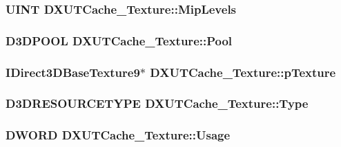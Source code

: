 \label{struct_d_x_u_t_cache___texture_a6c3eaa5b8daece02e1d6dd7d25c5b07b}
\hypertarget{struct_d_x_u_t_cache___texture_a74815def3a731c1f8f91671d2911da56}{
\subsubsection[{MipLevels}]{\setlength{\rightskip}{0pt plus 5cm}UINT {\bf DXUTCache\_\-Texture::MipLevels}}}
\label{struct_d_x_u_t_cache___texture_a74815def3a731c1f8f91671d2911da56}
\hypertarget{struct_d_x_u_t_cache___texture_ae08c2f8171241e38e1e0137ccf6315a2}{
\subsubsection[{Pool}]{\setlength{\rightskip}{0pt plus 5cm}D3DPOOL {\bf DXUTCache\_\-Texture::Pool}}}
\label{struct_d_x_u_t_cache___texture_ae08c2f8171241e38e1e0137ccf6315a2}
\hypertarget{struct_d_x_u_t_cache___texture_ac776b61763c8a6d71e5b250f5aa2d4a4}{
\subsubsection[{pTexture}]{\setlength{\rightskip}{0pt plus 5cm}IDirect3DBaseTexture9$\ast$ {\bf DXUTCache\_\-Texture::pTexture}}}
\label{struct_d_x_u_t_cache___texture_ac776b61763c8a6d71e5b250f5aa2d4a4}
\hypertarget{struct_d_x_u_t_cache___texture_a7ae45cc28d48e8d8d8051511fe404262}{
\subsubsection[{Type}]{\setlength{\rightskip}{0pt plus 5cm}D3DRESOURCETYPE {\bf DXUTCache\_\-Texture::Type}}}
\label{struct_d_x_u_t_cache___texture_a7ae45cc28d48e8d8d8051511fe404262}
\hypertarget{struct_d_x_u_t_cache___texture_a62b5039d2484ee1957f7742545e61afc}{
\subsubsection[{Usage}]{\setlength{\rightskip}{0pt plus 5cm}DWORD {\bf DXUTCache\_\-Texture::Usage}}}
